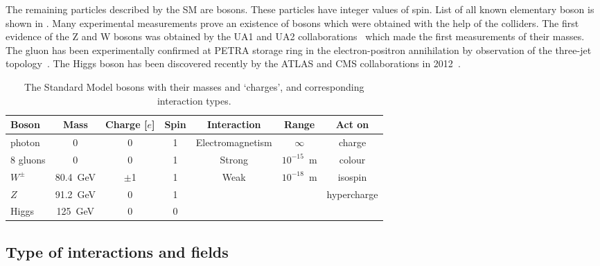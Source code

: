 The remaining particles described by the SM are bosons. These particles have integer values of spin.
List of all known elementary boson is shown in .
Many experimental measurements prove an existence of bosons which were obtained with the help of the colliders.
The first evidence of the Z and W bosons was obtained by the UA1 and UA2 collaborations~\cite{ARNISON1983103, BAGNAIA1983130}
which made the first measurements of their masses.
The gluon has been experimentally confirmed at PETRA storage ring in the electron-positron annihilation by observation of the three-jet topology~\cite{three_jet_event}.
The Higgs boson has been discovered recently by the ATLAS and CMS collaborations in 2012~\cite{Aad2012tfa, Chatrchyan2012ufa}.

\begin{table}[h!]
\begin{center}
{
\begin{tabular}{|l|c|c|c|c|c|c|}\cline{1-7}
 Boson & Mass &  Charge [$e$] & Spin  & Interaction & Range & Act on \\ \hline
    photon  &  0  &  0 & 1 &  Electromagnetism & $ \infty $  &  charge \\ \hline
  8 gluons  &  0  &  0 & 1 &  Strong & $10^{-15}$~m &  colour \\ \hline
    $W^{\pm}$   &  80.4~GeV  &  $\pm$1 & 1 &  \multirow{2}{*}{Weak}  & \multirow{2}{*}{$10^{-18}$~m} & isospin  \\
    $Z$   &  91.2~GeV  &  0 & 1 &  &  & hypercharge \\ \hline
    Higgs   &  125~GeV  &  0 & 0 &  &  &   \\ 
\hline
\end{tabular}
}
\caption{\label{tab:bosons}The Standard Model bosons with their masses and `charges', and corresponding interaction types. }
\end{center}
\end{table}




\subsection{Type of interactions and fields}

